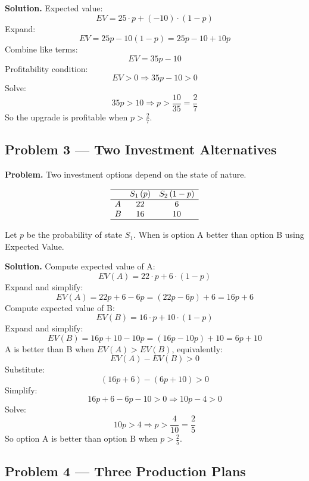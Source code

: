\begin{ExamProblems}
		\textbf{Solution.}
		Expected value:
		\[
		EV = 25\cdot p + (-10)\cdot(1-p)
		\]
		Expand:
		\[
		EV = 25p - 10(1-p) = 25p - 10 + 10p
		\]
		Combine like terms:
		\[
		EV = 35p - 10
		\]
		Profitability condition:
		\[
		EV>0 \Rightarrow 35p-10>0
		\]
		Solve:
		\[
		35p>10 \Rightarrow p>\frac{10}{35}=\frac{2}{7}
		\]
		So the upgrade is profitable when \(p>\frac{2}{7}\).
		
		
		\hypertarget{c7-ex3}{}
		\item
		\subsection*{Problem 3 — Two Investment Alternatives}
		
		\textbf{Problem.}
		Two investment options depend on the state of nature.
		
		\[
		\begin{array}{lcc}
			\hline
			& S_1\,(p) & S_2\,(1-p) \\
			\hline
			A & 22 & 6 \\
			B & 16 & 10 \\
			\hline
		\end{array}
		\]
		
		Let \(p\) be the probability of state \(S_1\).  
		When is option A better than option B using Expected Value.
		
		\textbf{Solution.}
		Compute expected value of A:
		\[
		EV(A)=22\cdot p + 6\cdot(1-p)
		\]
		Expand and simplify:
		\[
		EV(A)=22p + 6 - 6p = (22p-6p)+6 = 16p+6
		\]
		Compute expected value of B:
		\[
		EV(B)=16\cdot p + 10\cdot(1-p)
		\]
		Expand and simplify:
		\[
		EV(B)=16p + 10 - 10p = (16p-10p)+10 = 6p+10
		\]
		A is better than B when \(EV(A)>EV(B)\), equivalently:
		\[
		EV(A)-EV(B)>0
		\]
		Substitute:
		\[
		(16p+6)-(6p+10)>0
		\]
		Simplify:
		\[
		16p+6-6p-10>0 \Rightarrow 10p-4>0
		\]
		Solve:
		\[
		10p>4 \Rightarrow p>\frac{4}{10}=\frac{2}{5}
		\]
		So option A is better than option B when \(p>\frac{2}{5}\).
		
		
		\hypertarget{c7-ex4}{}
		\item
		\subsection*{Problem 4 — Three Production Plans}
		

\end{ExamProblems}
